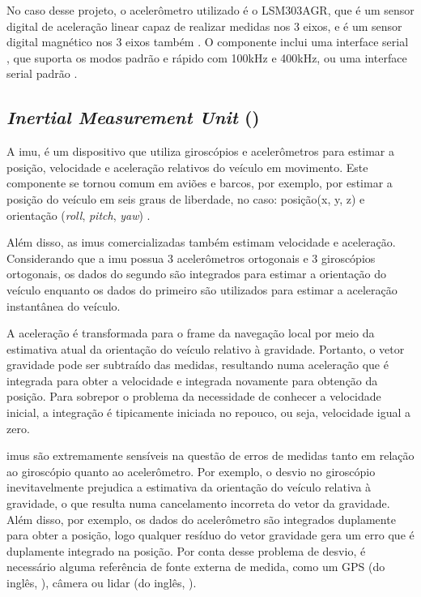\documentclass[acronym, symbols, table]{fei}
\begin{document}
				No caso desse projeto, o acelerômetro utilizado é o LSM303AGR, que é um sensor digital de aceleração linear capaz de realizar medidas nos 3 eixos, e é um sensor digital magnético nos 3 eixos também \cite{datasheet_accel}. O componente inclui uma interface serial , que suporta os modos padrão e rápido com 100kHz e 400kHz, ou uma interface serial padrão .
				
			\subsection{\textit{Inertial Measurement Unit} ()}
			
				A \acrshort{imu}, é um dispositivo que utiliza giroscópios e acelerômetros para estimar a posição, velocidade e aceleração relativos do veículo em movimento. Este componente se tornou comum em aviões e barcos, por exemplo, por estimar a posição do veículo em seis graus de liberdade, no caso: posição(x, y, z) e orientação (\textit{roll}, \textit{pitch}, \textit{yaw}) \cite{siegwart2011introduction}.
				
				Além disso, as \acrshort{imu}s comercializadas também estimam velocidade e aceleração. Considerando que a \acrshort{imu} possua 3 acelerômetros ortogonais e 3 giroscópios ortogonais, os dados do segundo são integrados para estimar a orientação do veículo enquanto os dados do primeiro são utilizados para estimar a aceleração instantânea do veículo.
				
				A aceleração é transformada para o frame da navegação local por meio da estimativa atual da orientação do veículo relativo à gravidade. Portanto, o vetor gravidade pode ser subtraído das medidas, resultando numa aceleração que é integrada para obter a velocidade e integrada novamente para obtenção da posição. Para sobrepor o problema da necessidade de conhecer a velocidade inicial, a integração é tipicamente iniciada no repouco, ou seja, velocidade igual a zero.
				
				\acrshort{imu}s são extremamente sensíveis na questão de erros de medidas tanto em relação ao giroscópio quanto ao acelerômetro. Por exemplo, o desvio no giroscópio inevitavelmente prejudica a estimativa da orientação do veículo relativa à gravidade, o que resulta numa cancelamento incorreta do vetor da gravidade. Além disso, por exemplo, os dados do acelerômetro são integrados duplamente para obter a posição, logo qualquer resíduo do vetor gravidade gera um erro que é duplamente integrado na posição. Por conta desse problema de desvio, é necessário alguma referência de fonte externa de medida, como um GPS (do inglês, ), câmera ou \acrshort{lidar} (do inglês, ).
		
\end{document}
